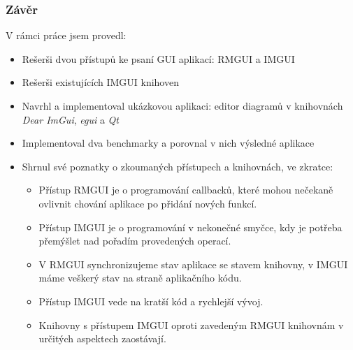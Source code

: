 \documentclass[FM,widescreen]{tulpresentation} %
\begin{document}
	\begin{frame}[plain]\frametitle{Závěr}
		V rámci práce jsem provedl:
		\begin{itemize}
			\item Rešerši dvou přístupů ke psaní GUI aplikací: RMGUI a IMGUI
			\item Rešerši existujících IMGUI knihoven
			\item Navrhl a implementoval ukázkovou aplikaci: editor diagramů v knihovnách \textit{Dear ImGui}, \textit{egui} a \textit{Qt}			
			\item Implementoval dva benchmarky a porovnal v nich výsledné aplikace
			\item Shrnul své poznatky o zkoumaných přístupech a knihovnách, ve zkratce:		
			\begin{itemize}
				\item Přístup RMGUI je o programování callbacků, které mohou nečekaně ovlivnit chování aplikace po přidání nových funkcí.
				\item Přístup IMGUI je o programování v nekonečné smyčce, kdy je potřeba přemýšlet nad pořadím provedených operací.
				\item V RMGUI synchronizujeme stav aplikace se stavem knihovny, v IMGUI máme veškerý stav na straně aplikačního kódu.
				\item Přístup IMGUI vede na kratší kód a rychlejší vývoj.
				\item Knihovny s přístupem IMGUI oproti zavedeným RMGUI knihovnám v určitých aspektech zaostávají.
			\end{itemize}
		\end{itemize}
	\end{frame}
	
	\TULendframe
\end{document}
